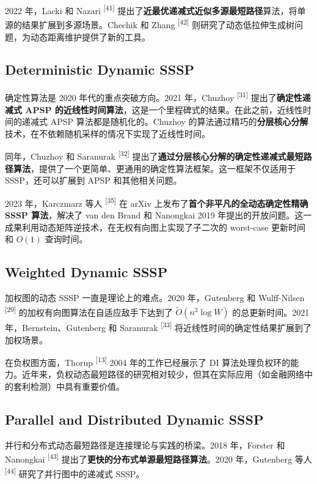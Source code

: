 \documentclass[12pt,a4paper]{ctexart}
\begin{document}
2022 年，Lacki 和 Nazari \textsuperscript{[41]}  提出了\textbf{近最优递减式近似多源最短路径}算法，将单源的结果扩展到多源场景。Chechik 和 Zhang \textsuperscript{[42]}  则研究了动态低拉伸生成树问题，为动态距离维护提供了新的工具。

\subsection{Deterministic Dynamic SSSP}

确定性算法是 2020 年代的重点突破方向。2021 年，Chuzhoy \textsuperscript{[31]}  提出了\textbf{确定性递减式 APSP 的近线性时间算法}，这是一个里程碑式的结果。在此之前，近线性时间的递减式 APSP 算法都是随机化的。Chuzhoy 的算法通过精巧的\textbf{分层核心分解}技术，在不依赖随机采样的情况下实现了近线性时间。

同年，Chuzhoy 和 Saranurak \textsuperscript{[32]}  提出了\textbf{通过分层核心分解的确定性递减式最短路径算法}，提供了一个更简单、更通用的确定性算法框架。这一框架不仅适用于 SSSP，还可以扩展到 APSP 和其他相关问题。

2023 年，Karczmarz 等人 \textsuperscript{[35]}  在 arXiv 上发布了\textbf{首个非平凡的全动态确定性精确 SSSP 算法}，解决了 van den Brand 和 Nanongkai 2019 年提出的开放问题。这一成果利用动态矩阵逆技术，在无权有向图上实现了子二次的 worst-case 更新时间和 $O(1)$ 查询时间。

\subsection{Weighted Dynamic SSSP}

加权图的动态 SSSP 一直是理论上的难点。2020 年，Gutenberg 和 Wulff-Nilsen \textsuperscript{[29]}  的加权有向图算法在自适应敌手下达到了 $\tilde{O}(n^2\log W)$ 的总更新时间。2021 年，Bernstein、Gutenberg 和 Saranurak \textsuperscript{[33]}  将近线性时间的确定性结果扩展到了加权场景。

在负权图方面，Thorup \textsuperscript{[13]}  2004 年的工作已经展示了 DI 算法处理负权环的能力。近年来，负权动态最短路径的研究相对较少，但其在实际应用（如金融网络中的套利检测）中具有重要价值。

\subsection{Parallel and Distributed Dynamic SSSP}

并行和分布式动态最短路径是连接理论与实践的桥梁。2018 年，Forster \allowbreak 和 Nanongkai \textsuperscript{[43]} 提出了\textbf{更快的分布式单源最短路径算法}。2020 年，Gutenberg 等人 \textsuperscript{[44]} 研究了并行图中的递减式 SSSP。
\end{document}
